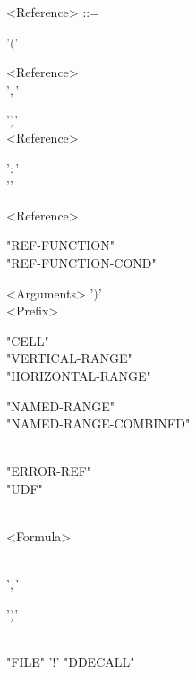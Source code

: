 \begin{grammar}
		<Reference> ::= \begin{syntdiag}[\footnotesize\sdlengths]
		\begin{stack} '$($' \begin{rep} <Reference> \\  '$,$' \end{rep} '$)$' \\
		<Reference> \begin{stack} '$:$' \\ '' \end{stack} <Reference> \\
		\begin{stack} "REF-FUNCTION" \\ "REF-FUNCTION-COND" \end{stack} <Arguments> '$)$' \\
		<Prefix>
		\begin{stack}
			"CELL" \\
			"VERTICAL-RANGE" \\
			"HORIZONTAL-RANGE" \\
			\begin{stack} "NAMED-RANGE" \\ "NAMED-RANGE-COMBINED" \end{stack} \\
			"ERROR-REF" \\
			"UDF" \begin{rep} \begin{stack} \\ <Formula> \end{stack} \\  '$,$' \end{rep} '$)$'
		\end{stack}
		\\"FILE" '$!$' "DDECALL"
		\end{stack}
		\end{syntdiag}
	\end{grammar}